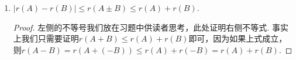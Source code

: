 \begin{enumerate}
\begin{proof}
\begin{enumerate}
\begin{align*}
\begin{pmatrix}
                                                                O   & O      & E_s & O \\
                                                                O   & C_{22} & O   & O
                                                            \end{pmatrix} \\
                             & \xrightarrow{\text{初等变换}}\begin{pmatrix}
                                                                E_r & O   & O      & O \\
                                                                O   & E_s & O      & O \\
                                                                O   & O   & C_{22} & O \\
                                                                O   & O   & O      & O
                                                            \end{pmatrix},
                        \end{align*}
                        故可以得到$r(A)+r(B)+r(C)\geqslant r\begin{pmatrix}
                                A & O \\ C & B
                            \end{pmatrix}\geqslant r(A)+r(B)$，同理可证$r(A)+r(B)+r(D)\geqslant r\begin{pmatrix}
                                A & D \\ O & B
                            \end{pmatrix}\geqslant r(A)+r(B)$.
              \end{enumerate}
          \end{proof}

    \item $|r(A)-r(B)|\leqslant r(A\pm B) \leqslant r(A)+r(B)$.

          \begin{proof}
              左侧的不等号我们放在习题中供读者思考，此处证明右侧不等式. 事实上我们只需要证明$r(A+B)\leqslant r(A)+r(B)$即可，因为如果上式成立，则$r(A-B)=r(A+(-B))\leqslant r(A)+r(-B)=r(A)+r(B)$.


\end{proof}
\end{enumerate}
